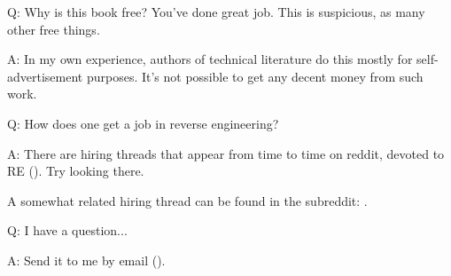 \documentclass[UTF8,nofonts]{ctexart}
\begin{document}
\par Q: Why is this book free? You've done great job. This is suspicious, as many other free things.
\par A: In my own experience, authors of technical literature do this mostly for self-advertisement purposes. It's not possible to get any decent money from such work.

\par Q: How does one get a job in reverse engineering?
\par A: There are hiring threads that appear from time to time on reddit, devoted to RE\FNURLREDDIT{}
(\RedditHiringThread{}).
Try looking there.

A somewhat related hiring thread can be found in the  subreddit: \NetsecHiringThread{}.

\par Q: I have a question...
\par A: Send it to me by email (\EMAIL).
\end{document}

